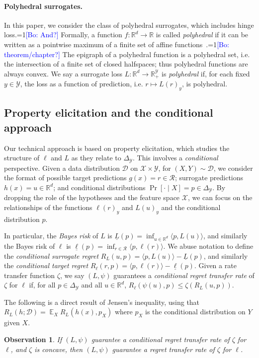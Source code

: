 \documentclass{article}
\newtheorem{observation}{Observation}
\newcommand{\Comments}{1}
\newcommand{\mynote}[2]{\ifnum\Comments=1\textcolor{#1}{#2}\fi}
\newcommand{\bo}[1]{\mynote{blue}{[Bo: #1]}}
\newcommand{\reals}{\mathbb{R}}
\newcommand{\simplex}{\Delta_\Y}
\newcommand{\D}{\mathcal{D}}
\DeclareMathOperator{\E}{\mathbb{E}}  %
\newcommand{\R}{\mathcal{R}}
\newcommand{\X}{\mathcal{X}}
\newcommand{\Y}{\mathcal{Y}}
\newcommand{\risk}[1]{\underline{#1}}
\newcommand{\inprod}[2]{\langle #1, #2 \rangle}%
\begin{document}
\paragraph{Polyhedral surrogates.}
In this paper, we consider the class of polyhedral surrogates, which includes hinge loss.\bo{And?}
Formally, a function $f: \reals^d \to \reals$ is called \emph{polyhedral} if it can be written as a pointwise maximum of a finite set of affine functions~\cite{rockafellar1997convex}.\bo{theorem/chapter?}
The epigraph of a polyhedral function is a polyhedral set, i.e. the intersection of a finite set of closed halfspaces; thus polyhedral functions are always convex.
We say a surrogate loss $L: \reals^d \to \reals_+^{\Y}$ is \emph{polyhedral} if, for each fixed $y \in \Y$, the loss as a function of prediction, i.e. $r \mapsto L(r)_y$, is polyhedral.

\subsection{Property elicitation and the conditional approach}
Our technical approach is based on property elicitation, which studies the structure of $\ell$ and $L$ as they relate to $\simplex$.
This involves a \emph{conditional} perspective.
Given a data distribution $\D$ on $\X \times \Y$, for $(X,Y) \sim \D$, we consider the format of possible target predictions $g(x) = r \in \R$; surrogate predictions $h(x) = u \in \reals^d$; and conditional distributions $\Pr[ \cdot \mid X] = p \in \simplex$.
By dropping the role of the hypotheses and the feature space $\X$, we can focus on the relationships of the functions $\ell(r)_y$ and $L(u)_y$ and the conditional distribution $p$.

In particular, the \emph{Bayes risk} of $L$ is $\risk{L}(p) = \inf_{u \in \reals^d} \inprod{p}{L(u)}$, and similarly the Bayes risk of $\ell$ is $\risk{\ell}(p) = \inf_{r \in \R} \inprod{p}{\ell(r)}$.
We abuse notation to define the \emph{conditional surrogate regret} $R_L(u,p) = \inprod{p}{L(u)} - \risk{L}(p)$, and similarly the \emph{conditional target regret} $R_{\ell}(r,p) = \inprod{p}{\ell(r)} - \risk{\ell}(p)$.
Given a rate transfer function $\zeta$, we say $(L,\psi)$ guarantees a \emph{conditional regret transfer rate} of $\zeta$ for $\ell$ if, for all $p \in \simplex$ and all $u \in \reals^d$, $R_{\ell}(\psi(u),p) \leq \zeta(R_L(u,p))$.

The following is a direct result of Jensen's inequality, using that $R_L(h;\D) = \E_X R_L(h(x),p_X)$ where $p_X$ is the conditional distribution on $Y$ given $X$.
\begin{observation} \label{obs:transfer}
  If $(L,\psi)$ guarantee a conditional regret transfer rate of $\zeta$ for $\ell$, and $\zeta$ is concave, then $(L,\psi)$ guarantee a regret transfer rate of $\zeta$ for $\ell$.
\end{observation}
 
\end{document}
